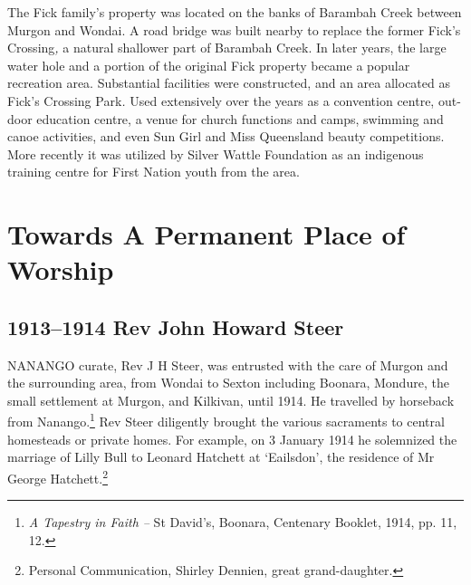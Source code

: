 The Fick family's property was located on the banks of Barambah Creek between Murgon and Wondai. A road bridge was built nearby to replace the former Fick's Crossing\emph{,} a natural shallower part of Barambah Creek. In later years, the large water hole and a portion of the original Fick property became a popular recreation area. Substantial facilities were constructed, and an area allocated as Fick's Crossing Park\emph{.} Used extensively over the years as a convention centre, out-door education centre, a venue for church functions and camps, swimming and canoe activities, and even Sun Girl and Miss Queensland beauty competitions. More recently it was utilized by Silver Wattle Foundation as an indigenous training centre for First Nation youth from the area.



\balance


\printendnotes[custom]
\setcounter{endnote}{0}
\chapter{Towards A Permanent Place of Worship}
\nobalance


\section{1913--1914 Rev John Howard Steer}



\lettrine[lines=3]{N}{ANANGO}
 curate, Rev J H Steer, was entrusted with the care of Murgon and the surrounding area, from Wondai to Sexton including Boonara, Mondure, the small settlement at Murgon, and Kilkivan, until 1914. He travelled by horseback from Nanango.\footnote{\emph{A Tapestry in Faith --} St David's, Boonara, Centenary Booklet, 1914, pp. 11, 12.} Rev Steer diligently brought the various sacraments to central homesteads or private homes. For example, on 3 January 1914 he solemnized the marriage of Lilly Bull to Leonard Hatchett at `Eailsdon', the residence of Mr George Hatchett.\footnote{Personal Communication, Shirley Dennien, great grand-daughter.}







